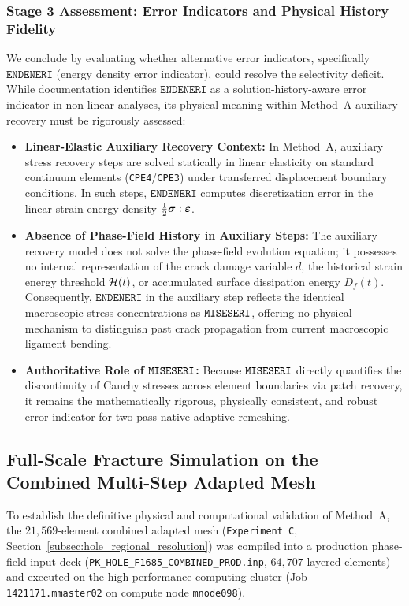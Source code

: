 \subsubsection{Stage 3 Assessment: Error Indicators and Physical History Fidelity}
We conclude by evaluating whether alternative error indicators, specifically $\texttt{ENDENERI}$ (energy density error indicator), could resolve the selectivity deficit. While \Abaqus documentation identifies $\texttt{ENDENERI}$ as a solution-history-aware error indicator in non-linear analyses, its physical meaning within Method~A auxiliary recovery must be rigorously assessed:
\begin{itemize}
  \item \textbf{Linear-Elastic Auxiliary Recovery Context:} In Method~A, auxiliary stress recovery steps are solved statically in linear elasticity on standard continuum elements (\texttt{CPE4}/\texttt{CPE3}) under transferred displacement boundary conditions. In such steps, $\texttt{ENDENERI}$ computes discretization error in the linear strain energy density $\frac{1}{2} \boldsymbol{\sigma} : \boldsymbol{\varepsilon}$.
  \item \textbf{Absence of Phase-Field History in Auxiliary Steps:} The auxiliary recovery model does not solve the phase-field evolution equation; it possesses no internal representation of the crack damage variable $d$, the historical strain energy threshold $\mathcal{H}(t)$, or accumulated surface dissipation energy $D_f(t)$. Consequently, $\texttt{ENDENERI}$ in the auxiliary step reflects the identical macroscopic stress concentrations as $\texttt{MISESERI}$, offering no physical mechanism to distinguish past crack propagation from current macroscopic ligament bending.
  \item \textbf{Authoritative Role of $\texttt{MISESERI}$:} Because $\texttt{MISESERI}$ directly quantifies the discontinuity of Cauchy stresses across element boundaries via patch recovery, it remains the mathematically rigorous, physically consistent, and robust error indicator for two-pass native \Abaqus adaptive remeshing.
\end{itemize}

\subsection{Full-Scale Fracture Simulation on the Combined Multi-Step Adapted Mesh}
\label{subsec:hole_combined_fracture_simulation}

To establish the definitive physical and computational validation of Method~A, the $21{,}569$-element combined adapted mesh (\texttt{Experiment C}, Section~\ref{subsec:hole_regional_resolution}) was compiled into a production phase-field input deck (\texttt{PK\_HOLE\_F1685\_COMBINED\_PROD.inp}, $64{,}707$ layered elements) and executed on the high-performance computing cluster (Job \texttt{1421171.mmaster02} on compute node \texttt{mnode098}). 

